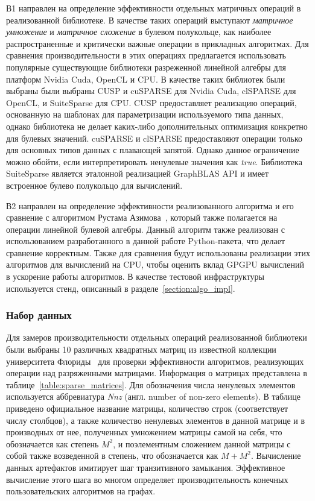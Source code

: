 В1 направлен на определение эффективности отдельных матричных операций в реализованной библиотеке. В качестве таких операций выступают \textit{матричное умножение} и \textit{матричное сложение} в булевом полукольце, как наиболее распространенные и критически важные операции в прикладных алгоритмах. Для сравнения производительности в этих операциях предлагается использовать популярные существующие библиотеки разреженной линейной алгебры для платформ Nvidia Cuda, OpenCL и CPU. В качестве таких библиотек были выбраны были выбраны CUSP и cuSPARSE для Nvidia Cuda, clSPARSE для OpenCL, и SuiteSparse для CPU. CUSP предоставляет реализацию операций, основанную на шаблонах для параметризации используемого типа данных, однако библиотека не делает каких-либо дополнительных оптимизация конкретно для булевых значений. cuSPARSE и clSPARSE предоставляют операции только для основных типов данных с плавающей запятой. Однако данное ограничение можно обойти, если интерпретировать ненулевые значения как \textit{true}. Библиотека SuiteSparse является эталонной реализацией GraphBLAS API и имеет встроенное булево полукольцо для вычислений.

В2 направлен на определение эффективности реализованного алгоритма и его сравнение с алгоритмом Рустама Азимова~\cite{inproceedings:cfqp_matrix_with_single_source}, который также полагается на операции линейной булевой алгебры. Данный алгоритм также реализован с использованием разработанного в данной работе Python-пакета, что делает сравнение корректным. Также для сравнения будут использованы реализации этих алгоритмов для вычислений на CPU, чтобы оценить вклад GPGPU вычислений в ускорение работы алгоритмов. В качестве тестовой инфраструктуры используется стенд, описанный в разделе~\ref{section:algo_impl}. 

\subsubsection*{Набор данных}

Для замеров производительности отдельных операций реализованной библиотеки были выбраны 10 различных квадратных матриц из известной коллекции университета Флориды~\cite{net:sp_matrix_data_florida} для проверки эффективности алгоритмов, реализующих операции над разряженными матрицами. 
Информация о матрицах представлена в таблице~\ref{table:sparse_matrices}. 
Для обозначения числа ненулевых элементов используется аббревиатура \textit{Nnz} (англ. number of non-zero elements). 
В таблице приведено официальное название матрицы, количество строк (соответствует числу столбцов), а также количество ненулевых элементов в данной матрице и в производных от нее, полученных умножением матрицы самой на себя, что обозначается как степень $M^2$, и поэлементным сложением данной матрицы с собой также возведенной в степень, что обозначается как $M + M^2$.
Вычисление данных артефактов имитирует шаг транзитивного замыкания.
Эффективное вычисление этого шага во многом определяет производительность конечных пользовательских алгоритмов на графах.

